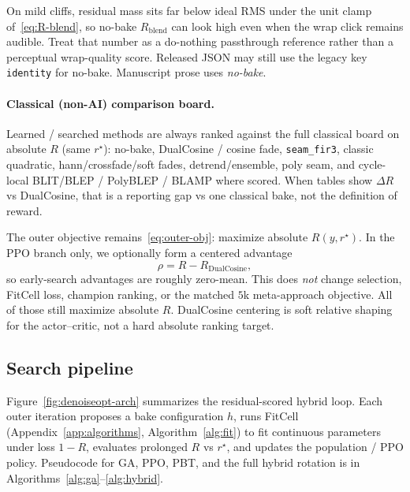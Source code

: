On mild cliffs, residual mass sits far below ideal RMS under the unit clamp of~\eqref{eq:R-blend}, so no-bake $R_{\mathrm{blend}}$ can look high even when the wrap click remains audible.
Treat that number as a do-nothing passthrough reference rather than a perceptual wrap-quality score.
Released JSON may still use the legacy key \texttt{identity} for no-bake.
Manuscript prose uses \emph{no-bake}.

\paragraph{Classical (non-AI) comparison board.}
\label{sec:classical-board}
Learned / searched methods are always ranked against the full classical board on absolute $R$ (same $r^{\star}$):
no-bake, DualCosine / cosine fade, \texttt{seam\_fir3}, classic quadratic, hann/crossfade/soft fades, detrend/ensemble, poly seam, and cycle-local BLIT/BLEP / PolyBLEP / BLAMP where scored.
When tables show $\Delta R$ vs DualCosine, that is a reporting gap vs one classical bake, not the definition of reward.

\begin{remark}
\label{rem:dualcosine-centering}
The outer objective remains~\eqref{eq:outer-obj}: maximize absolute $R(y,r^{\star})$.
In the PPO branch only, we optionally form a centered advantage
\begin{equation}
\label{eq:dualcosine-centering}
\rho = R - R_{\mathrm{DualCosine}},
\end{equation}
so early-search advantages are roughly zero-mean.
This does \emph{not} change selection, FitCell loss, champion ranking, or the matched $5$k meta-approach objective.
All of those still maximize absolute $R$.
DualCosine centering is soft relative shaping for the actor--critic, not a hard absolute ranking target.
\end{remark}

\subsection{Search pipeline}
\label{sec:pipeline-overview}

Figure~\ref{fig:denoiseopt-arch} summarizes the residual-scored hybrid loop.
Each outer iteration proposes a bake configuration $h$, runs FitCell (Appendix~\ref{app:algorithms}, Algorithm~\ref{alg:fit}) to fit continuous parameters under loss $1-R$, evaluates prolonged $R$ vs $r^{\star}$, and updates the population / PPO policy.
Pseudocode for GA, PPO, PBT, and the full hybrid rotation is in Algorithms~\ref{alg:ga}--\ref{alg:hybrid}.

